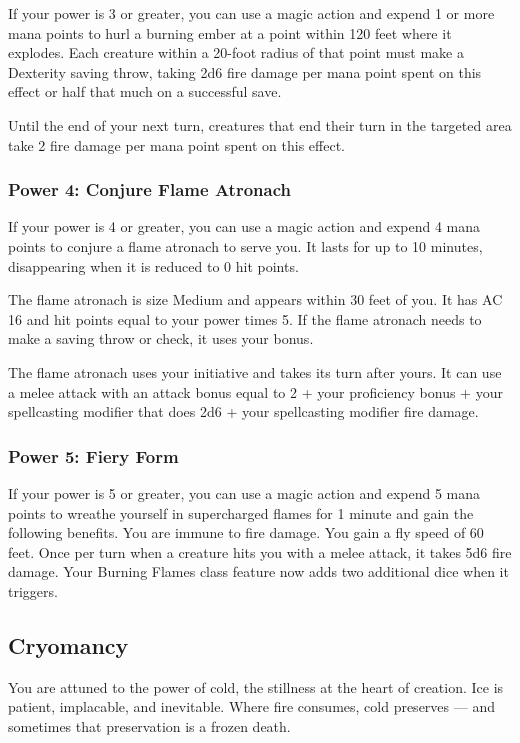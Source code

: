 \documentclass[12pt,letterpaper,twocolumn,openany,nodeprecatedcode,bg=none]{dndbook}
\begin{document}
If your power is 3 or greater, you can use a magic action and expend 1
or more mana points to hurl a burning ember at a point within 120 feet
where it explodes. Each creature within a 20-foot radius of that point
must make a Dexterity saving throw, taking 2d6 fire damage per mana
point spent on this effect or half that much on a successful save.

Until the end of your next turn, creatures that end their turn in the
targeted area take 2 fire damage per mana point spent on this effect.

\subsubsection{Power 4: Conjure Flame
Atronach}\label{power-4-conjure-flame-atronach}

If your power is 4 or greater, you can use a magic action and expend 4
mana points to conjure a flame atronach to serve you. It lasts for up to
10 minutes, disappearing when it is reduced to 0 hit points.

The flame atronach is size Medium and appears within 30 feet of you. It
has AC 16 and hit points equal to your power times 5. If the flame
atronach needs to make a saving throw or check, it uses your bonus.

The flame atronach uses your initiative and takes its turn after yours.
It can use a melee attack with an attack bonus equal to 2 + your
proficiency bonus + your spellcasting modifier that does 2d6 + your
spellcasting modifier fire damage.

\subsubsection{Power 5: Fiery Form}\label{power-5-fiery-form}

If your power is 5 or greater, you can use a magic action and expend 5
mana points to wreathe yourself in supercharged flames for 1 minute and
gain the following benefits. You are immune to fire damage. You gain a
fly speed of 60 feet. Once per turn when a creature hits you with a
melee attack, it takes 5d6 fire damage. Your Burning Flames class
feature now adds two additional dice when it triggers.

\subsection{Cryomancy}\label{cryomancy}

You are attuned to the power of cold, the stillness at the heart of
creation. Ice is patient, implacable, and inevitable. Where fire
consumes, cold preserves --- and sometimes that preservation is a frozen
death.
\end{document}
